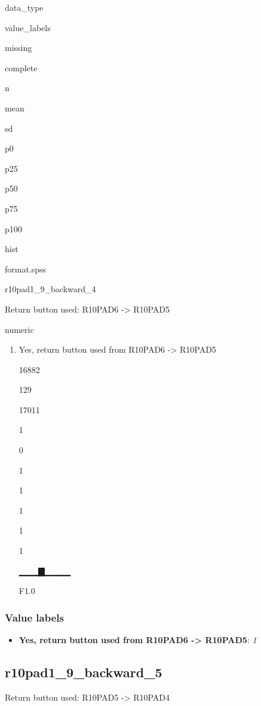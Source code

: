 \documentclass[]{book}
\providecommand{\tightlist}{%
  \setlength{\itemsep}{0pt}\setlength{\parskip}{0pt}}
\begin{document}
data\_type

value\_labels

missing

complete

n

mean

sd

p0

p25

p50

p75

p100

hist

format.spss

r10pad1\_9\_backward\_4

Return button used: R10PAD6 -\textgreater{} R10PAD5

numeric

\begin{enumerate}
\def\labelenumi{\arabic{enumi}.}
\tightlist
\item
  Yes, return button used from R10PAD6 -\textgreater{} R10PAD5

  16882

  129

  17011

  1

  0

  1

  1

  1

  1

  1

  ▁▁▁▇▁▁▁▁

  F1.0
\end{enumerate}

\subsubsection{Value labels}\label{r10pad1_9_backward_4_labels}

\begin{itemize}
\tightlist
\item
  \textbf{Yes, return button used from R10PAD6 -\textgreater{} R10PAD5}:
  \emph{1}
\end{itemize}

\subsection{r10pad1\_9\_backward\_5}\label{r10pad1_9_backward_5}

Return button used: R10PAD5 -\textgreater{} R10PAD4
\end{document}

